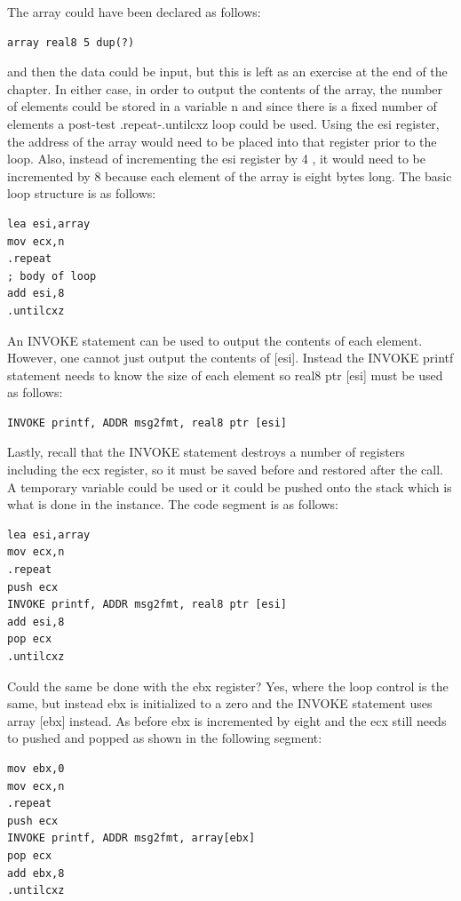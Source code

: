\documentclass[10pt]{book}
\begin{document}
The array could have been declared as follows:

\begin{verbatim}
array real8 5 dup(?)
\end{verbatim}

and then the data could be input, but this is left as an exercise at the end of the chapter. In either case, in order to output the contents of the array, the number of elements could be stored in a variable n and since there is a fixed number of elements a post-test .repeat-.untilcxz loop could be used. Using the esi register, the address of the array would need to be placed into that register prior to the loop. Also, instead of incrementing the esi register by 4 , it would need to be incremented by 8 because each element of the array is eight bytes long. The basic loop structure is as follows:

\begin{verbatim}
lea esi,array
mov ecx,n
.repeat
; body of loop
add esi,8
.untilcxz
\end{verbatim}

An INVOKE statement can be used to output the contents of each element. However, one cannot just output the contents of [esi]. Instead the INVOKE printf statement needs to know the size of each element so real8 ptr [esi] must be used as follows:

\begin{verbatim}
INVOKE printf, ADDR msg2fmt, real8 ptr [esi]
\end{verbatim}

Lastly, recall that the INVOKE statement destroys a number of registers including the ecx register, so it must be saved before and restored after the call. A temporary variable could be used or it could be pushed onto the stack which is what is done in the instance. The code segment is as follows:

\begin{verbatim}
lea esi,array
mov ecx,n
.repeat
push ecx
INVOKE printf, ADDR msg2fmt, real8 ptr [esi]
add esi,8
pop ecx
.untilcxz
\end{verbatim}

Could the same be done with the ebx register? Yes, where the loop control is the same, but instead ebx is initialized to a zero and the INVOKE statement uses array [ebx] instead. As before ebx is incremented by eight and the ecx still needs to pushed and popped as shown in the following segment:

\begin{verbatim}
mov ebx,0
mov ecx,n
.repeat
push ecx
INVOKE printf, ADDR msg2fmt, array[ebx]
pop ecx
add ebx,8
.untilcxz
\end{verbatim}
\end{document}
